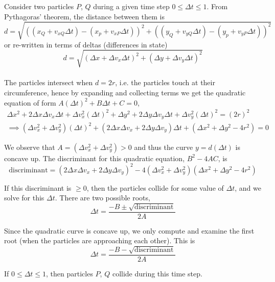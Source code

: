 \documentclass[12pt]{article}
\begin{document}
\begin{enumerate}
	Consider two particles $P$, $Q$ during a given time step $0 \leq \Delta t \leq 1$. From Pythagoras’ theorem, the distance between them is
	$$d = \sqrt{\left( \left( x_Q + v_{xQ} \Delta t \right) - \left( x_p + v_{xP} \Delta t \right) \right)^2 +
		\left( \left( y_Q + v_{yQ} \Delta t \right) - \left( y_p + v_{yP} \Delta t \right) \right)^2}$$
	or re-written in terms of deltas (differences in state)
	$$d = \sqrt{\left( \Delta x + \Delta v_x \Delta t \right)^2 +
		\left( \Delta y + \Delta v_y \Delta t \right)^2}$$
    \\
	The particles intersect when $d = 2r$, i.e. the particles touch at their circumference, hence by expanding and collecting terms we get the quadratic equation of form $A (\Delta t)^2 + B \Delta t + C = 0$,
	\begin{align*}
		\Delta x^2 + 2 \Delta x \Delta v_x \Delta t + \Delta v_x^2 (\Delta t)^2 + \Delta y^2 + 2 \Delta y \Delta v_y \Delta t + \Delta v_y^2 (\Delta t)^2 = (2r)^2 \\
		\implies (\Delta v_x^2 + \Delta v_y^2) (\Delta t)^2 + (2 \Delta x \Delta v_x + 2 \Delta y \Delta v_y) \Delta t + (\Delta x^2 + \Delta y^2 - 4r^2) = 0
	\end{align*}
	
	We observe that $A = (\Delta v_x^2 + \Delta v_y^2) > 0$ and thus the curve $y = d(\Delta t)$ is concave up. The discriminant for this quadratic equation, $B^2 - 4AC$, is
	$$\textrm{discriminant} = (2 \Delta x \Delta v_x + 2 \Delta y \Delta v_y)^2 - 4(\Delta v_x^2 + \Delta v_y^2)(\Delta x^2 + \Delta y^2 - 4r^2)$$
	
	If this discriminant is $\geq 0$, then the particles collide for some value of $\Delta t$, and we solve for this $\Delta t$. There are two possible roots,
	$$\Delta t = \frac{-B \pm \sqrt{\textrm{discriminant}}}{2A}$$
	
	Since the quadratic curve is concave up, we only compute and examine the first root (when the particles are approaching each other). This is
	$$\Delta t = \frac{-B - \sqrt{\textrm{discriminant}}}{2A}$$
	
	If $0 \leq \Delta t \leq 1$, then particles $P$, $Q$ collide during this time step.
	

\end{enumerate}
\end{document}
